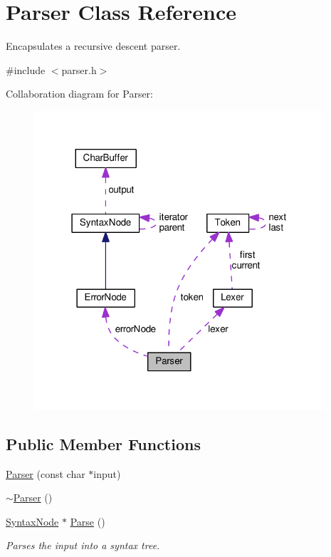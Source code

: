 \hypertarget{classParser}{}\section{Parser Class Reference}
\label{classParser}


Encapsulates a recursive descent parser.  




{\ttfamily \#include $<$parser.\+h$>$}



Collaboration diagram for Parser\+:
\nopagebreak
\begin{figure}[H]
\begin{center}
\leavevmode
\includegraphics[width=307pt]{d8/db0/classParser__coll__graph}
\end{center}
\end{figure}
\subsection*{Public Member Functions}
\begin{DoxyCompactItemize}
\item 
\hyperlink{classParser_a40600baa2c3d4262fd8b770a4615aed0}{Parser} (const char $\ast$input)
\item 
\hyperlink{classParser_a3e658b5917a93a3ef648050d060e3a93}{$\sim$\+Parser} ()
\item 
\hyperlink{classSyntaxNode}{Syntax\+Node} $\ast$ \hyperlink{classParser_a1861d1d9cc6165970cf07e07cacd11df}{Parse} ()
\begin{DoxyCompactList}\small\item\em Parses the input into a syntax tree. \end{DoxyCompactList}\end{DoxyCompactItemize}
